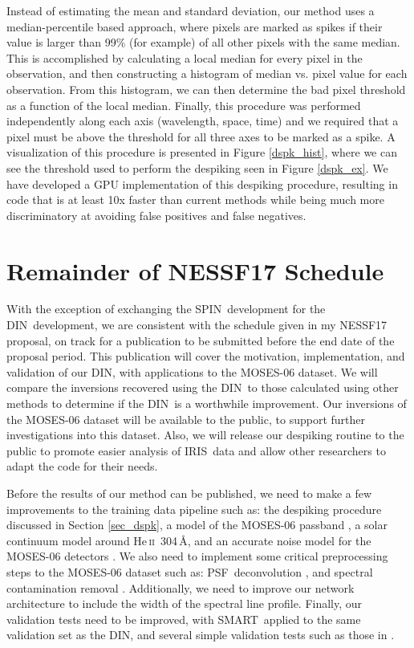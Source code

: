 \documentclass[10pt,letterpaper]{article}
\newcommand{\HeII}{He\,\textsc{ii}~304\,\AA}
\newcommand{\MOSES}{\ac{MOSES}}
\newcommand{\SMART}{\ac{SMART}}
\newcommand{\DIN}{\ac{DIN}}
\newcommand{\SPIN}{\ac{SPIN}}
\newcommand{\IRIS}{\ac{IRIS}}
\newcommand{\PSF}{\ac{PSF}}
\begin{document}
			Instead of estimating the mean and standard deviation, our method uses a median-percentile based approach, where pixels are marked as spikes if their value is larger than 99\% (for example) of all other pixels with the same median. 
			This is accomplished by calculating a local median for every pixel in the observation, and then constructing a histogram of median vs. pixel value for each observation.
			From this histogram, we can then determine the bad pixel threshold as a function of the local median.
			Finally, this procedure was performed independently along each axis (wavelength, space, time) and we required that a pixel must be above the threshold for all three axes to be marked as a spike.
			A visualization of this procedure is presented in Figure \ref{dspk_hist}, where we can see the threshold used to perform the despiking seen in Figure \ref{dspk_ex}.		
			We have developed a GPU implementation of this despiking procedure, resulting in code that is at least 10x faster than current methods while being much more discriminatory at avoiding false positives and false negatives.

		
	\section{Remainder of NESSF17 Schedule}
	
		With the exception of exchanging the \SPIN\ development for the \DIN\ development, we are consistent with the schedule given in my NESSF17 proposal, on track for a publication to be submitted before the end date of the proposal period.
		This publication will cover the motivation, implementation, and validation of our \DIN, with applications to the \MOSES-06 dataset.
		We will compare the inversions recovered using the \DIN\ to those calculated using other methods to determine if the \DIN\ is a worthwhile improvement.
		Our inversions of the \MOSES-06 dataset will be available to the public, to support further investigations into this dataset.
		Also, we will release our despiking routine to the public to promote easier analysis of \IRIS\ data and allow other researchers to adapt the code for their needs.
		
		Before the results of our method can be published, we need to make a few improvements to the training data pipeline such as: the despiking procedure discussed in Section \ref{sec_dspk}, a model of the \MOSES-06 passband \citep{Fox2011}, a solar continuum model around \HeII \citep{Fox2011}, and an accurate noise model for the \MOSES-06 detectors \cite{Rust2017}.
		We also need to implement some critical preprocessing steps to the \MOSES-06 dataset such as: \PSF\ deconvolution \citep{Rust2017}, and spectral contamination removal \citep{Parker2016}.
		Additionally, we need to improve our network architecture to include the width of the spectral line profile.
		Finally, our validation tests need to be improved, with \SMART\ applied to the same validation set as the \DIN, and several simple validation tests such as those in \cite{Rust2017}.
	
\end{document}
